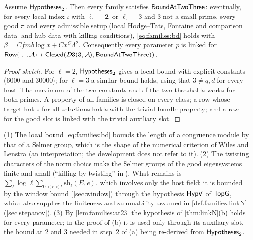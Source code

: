 \begin{lemma}\Fmark\label{lem:families:at23}
Assume $\mathsf{Hypotheses}_2$. Then every family satisfies $\mathsf{BoundAtTwoThree}$: eventually, for every local
index $\iota$ with $\ell_\iota=2$, or $\ell_\iota=3$ and $3$ not a small prime, every good $\pi$ and every
admissible setup (local Hodge--Tate, Fontaine and comparison data, and hub data with killing conditions),
\eqref{eq:families:bd} holds with $\beta=Cfmb\log x+Cx^C\Lambda^2$. Consequently every parameter $p$ is linked
for $\mathsf{Row}(\cdot,\cdot,\mathcal A\mapsto\mathsf{Closed}(D3(3,\mathcal A),\mathsf{BoundAtTwoThree}))$.
\end{lemma}

\begin{proof}[Proof sketch]
For $\ell=2$, $\mathsf{Hypotheses}_2$ gives a local bound with explicit constants ($6000$ and $30000$); for
$\ell=3$ a similar bound holds, using that $3\ne q,d$ for every host. The maximum of the two constants and of the
two thresholds works for both primes. A property of all families is closed on every class; a row whose target
holds for all selections holds with the trivial bundle property; and a row for the good slot is linked with the
trivial auxiliary slot.
\end{proof}

\begin{remark}\label{rem:families:linkN}
(1) The local bound \eqref{eq:families:bd} bounds the length of a congruence module by that of a Selmer group,
which is the shape of the numerical criterion of Wiles and Lenstra \cite{Wiles1995,Lenstra1995} (an interpretation;
the development does not refer to it). (2) The twisting characters of the norm choice make the Selmer groups of the
good eigensystems finite and small (``killing by twisting'' in \cite{Announcement2026}). What remains is
$\sum_\ell\log\ell\sum_{0<e<t}\mathrm{sh}_\ell(E,e)$, which involves only the host field; it is bounded by the
window bound (\cref{sec:window}) through the hypothesis $\mathsf{HypV}$ of $\mathsf{TopG}$, which also supplies the
finiteness and summability assumed in \cref{def:families:linkN} (\cref{sec:stepanov}). (3) By
\cref{lem:families:at23} the hypothesis of \cref{thm:linkN}(b) holds for every parameter; in the proof of (b) it
is used only through its auxiliary slot, the bound at $2$ and $3$ needed in step~2 of (a) being re-derived from
$\mathsf{Hypotheses}_2$.
\end{remark}


